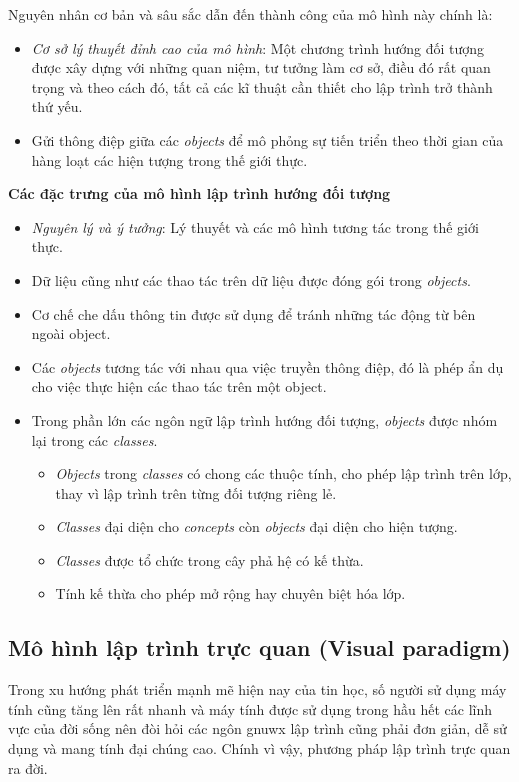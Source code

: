 \documentclass[10pt, a4paper]{article}
\begin{document}
Nguyên nhân cơ bản và sâu sắc dẫn đến thành công của mô hình này chính là:
\begin{itemize}
\item  \emph{Cơ sở lý thuyết đỉnh cao của mô hình}: Một chương trình hướng đối tượng được xây dựng với những quan niệm, tư tưởng làm cơ sở, điều đó rất quan trọng và theo cách đó, tất cả các kĩ thuật cần thiết cho lập trình trở thành thứ yếu.
\item Gửi thông điệp giữa các \emph{objects} để mô phỏng sự tiến triển theo thời gian của hàng loạt các hiện tượng trong thế giới thực.\\
\end{itemize}

\textbf{Các đặc trưng của mô hình lập trình hướng đối tượng}
\begin{itemize}
\item \emph{Nguyên lý và ý tưởng}: Lý thuyết và các mô hình tương tác trong thế giới thực.
\item Dữ liệu cũng như các thao tác trên dữ liệu được đóng gói trong \emph{objects}.
\item Cơ chế che dấu thông tin được sử dụng để tránh những tác động từ bên ngoài object.
\item Các \emph{objects} tương tác với nhau qua việc truyền thông điệp, đó là phép ẩn dụ cho việc thực hiện các thao tác trên một object.
\item Trong phần lớn các ngôn ngữ lập trình hướng đối tượng, \emph{objects} được nhóm lại trong các \emph{classes}.
\begin{itemize}
\item \emph{Objects} trong \emph{classes} có chong các thuộc tính, cho phép lập trình trên lớp, thay vì lập trình trên từng đối tượng riêng lẻ.
\item \emph{Classes} đại diện cho \emph{concepts} còn \emph{objects} đại diện cho hiện tượng.
\item \emph{Classes} được tổ chức trong cây phả hệ có kế thừa.
\item Tính kế thừa cho phép mở rộng hay chuyên biệt hóa lớp.
\end{itemize}
\end{itemize}

\subsection{Mô hình lập trình trực quan (Visual paradigm)}

Trong xu hướng phát triển mạnh mẽ hiện nay của tin học, số người sử dụng máy tính cũng tăng lên rất nhanh và máy tính được sử dụng trong hầu hết các lĩnh vực của đời sống nên đòi hỏi các ngôn gnuwx lập trình cũng phải đơn giản, dễ sử dụng và mang tính đại chúng cao. Chính vì vậy, phương pháp lập trình trực quan ra đời.
\end{document}

